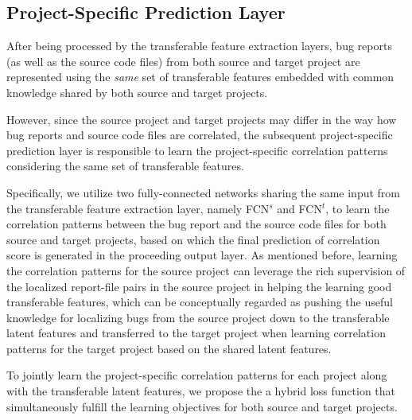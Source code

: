 
\subsection{Project-Specific Prediction Layer} %

After being processed by the transferable feature extraction layers, bug reports (as well as the source code files) from both source and target project are represented using the \emph{same} set of transferable features embedded with common knowledge shared by both source and target projects.


However, since the source project and target projects may differ in the way how bug reports and source code files are correlated, the subsequent project-specific prediction layer is responsible to learn the project-specific correlation patterns considering the same set of transferable features.

Specifically, we utilize two fully-connected networks sharing the same input from the transferable feature extraction layer, namely FCN$^s$ and FCN$^t$, to learn the correlation patterns between the bug report and the source code files for both source and target projects, based on which the final prediction of correlation score is generated in the proceeding output layer. As mentioned before, learning the correlation patterns for the source project can leverage the rich supervision of the localized report-file pairs in the source project in helping the learning good transferable features, which can be conceptually regarded as pushing the useful knowledge for localizing bugs from the source project down to the transferable latent features and transferred to the target project when learning correlation patterns for the target project based on the shared latent features. 


To jointly learn the project-specific correlation patterns for each project along with the transferable latent features, we propose the a hybrid loss function that simultaneously fulfill the learning objectives for both source and target projects. 

